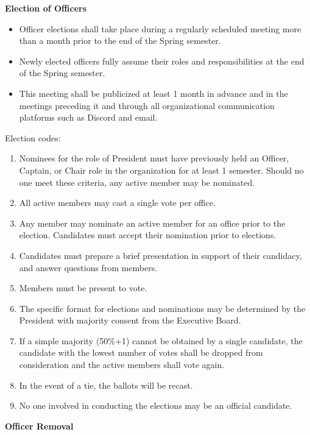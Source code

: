 \documentclass[12pt]{article}
\begin{document}
\textbf{Election of Officers}

\begin{itemize}
  \item Officer elections shall take place during a regularly scheduled meeting more than a month prior to the end of the Spring semester.
  \item Newly elected officers fully assume their roles and responsibilities at the end of the Spring semester.
  \item This meeting shall be publicized at least 1 month in advance and in the meetings preceding it and through all organizational communication platforms such as Discord and email.
\end{itemize}

Election codes:
\begin{enumerate}
  \item Nominees for the role of President must have previously held an Officer, Captain, or Chair role in the organization for at least 1 semester. Should no one meet these criteria, any active member may be nominated.
  \item All active members may cast a single vote per office.
  \item Any member may nominate an active member for an office prior to the election. Candidates must accept their nomination prior to elections.
  \item Candidates must prepare a brief presentation in support of their candidacy, and answer questions from members.
  \item Members must be present to vote.
  \item The specific format for elections and nominations may be determined by the President with majority consent from the Executive Board.
  \item If a simple majority (50\%+1) cannot be obtained by a single candidate, the candidate with the lowest number of votes shall be dropped from consideration and the active members shall vote again.
  \item In the event of a tie, the ballots will be recast.
  \item No one involved in conducting the elections may be an official candidate.
\end{enumerate}

\textbf{Officer Removal}
\end{document}
